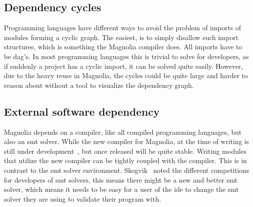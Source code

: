 \subsection{Dependency cycles}

Programming languages have different ways to avoid the problem of imports of
modules forming a cyclic graph. The easiest, is to simply disallow such import
structures, which is something the Magnolia compiler does. All imports have to be
\gls*{dag}'s. In most programming languages this is trivial to solve for
developers, as if suddenly a project has a cyclic import, it can be solved quite
easily. However, due to the heavy reuse in Magnolia, the cycles could be quite
large and harder to reason about without a tool to visualize the dependency graph.

\subsection{External software dependency}

Magnolia depends on a compiler, like all compiled programming languages, but
also an \gls*{smt} solver. While the new compiler for Magnolia, at the time of
writing is still under development~\cite{wiig}, but once released will be quite
stable. Writing modules that utilize the new compiler can be tightly coupled
with the compiler. This is in contrast to the \gls*{smt} solver environment.
Skogvik~\cite{beateVerification} noted the different competitions for developers
of \gls*{smt} solvers, this means there might be a new and better \gls*{smt}
solver, which means it needs to be easy for a user of the \gls*{ide} to change
the \gls*{smt} solver they are using to validate their program with.
